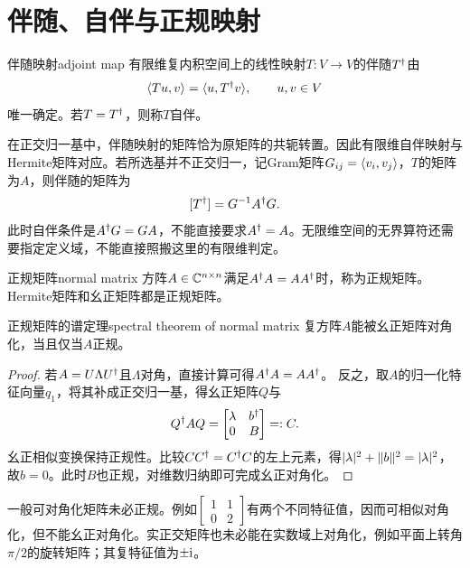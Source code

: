 \section{伴随、自伴与正规映射}
\begin{definition}{伴随映射}{adjoint map}
    有限维复内积空间上的线性映射$T:V \to V$的伴随$T^\dagger$由
    \begin{equation}\label{eq:la-adjoint-definition}
        \langle Tu,v\rangle = \langle u,T^\dagger v\rangle,\qquad u,v \in V
    \end{equation}
    唯一确定。若$T = T^\dagger$，则称$T$自伴。
\end{definition}
在正交归一基中，伴随映射的矩阵恰为原矩阵的共轭转置。因此有限维自伴映射与Hermite矩阵对应。若所选基并不正交归一，记Gram矩阵$G_{ij} = \langle v_i,v_j\rangle$，$T$的矩阵为$A$，则伴随的矩阵为
\begin{equation}\label{eq:la-adjoint-gram-matrix}
    [T^\dagger] = G^{-1} A^\dagger G.
\end{equation}
此时自伴条件是$A^\dagger G = GA$，不能直接要求$A^\dagger = A$。无限维空间的无界算符还需要指定定义域，不能直接照搬这里的有限维判定。

\begin{definition}{正规矩阵}{normal matrix}
    方阵$A \in \mathbb{C}^{n\times n}$满足$A^\dagger A = AA^\dagger$时，称为正规矩阵。Hermite矩阵和幺正矩阵都是正规矩阵。
\end{definition}
\begin{theorem}{正规矩阵的谱定理}{spectral theorem of normal matrix}
    复方阵$A$能被幺正矩阵对角化，当且仅当$A$正规。
\end{theorem}
\begin{proof}
    若$A = U\Lambda U^\dagger$且$\Lambda$对角，直接计算可得$A^\dagger A = AA^\dagger$。
    反之，取$A$的归一化特征向量$q_1$，将其补成正交归一基，得幺正矩阵$Q$与
    \[
        Q^\dagger AQ = \begin{bmatrix}\lambda&b^\dagger\\0&B\end{bmatrix} =: C.
    \]
    幺正相似变换保持正规性。比较$CC^\dagger = C^\dagger C$的左上元素，得$\lvert\lambda\rvert^2 + \lVert b\rVert^2 = \lvert\lambda\rvert^2$，故$b = 0$。此时$B$也正规，对维数归纳即可完成幺正对角化。
\end{proof}
\begin{remark}
    一般可对角化矩阵未必正规。例如$\begin{bmatrix}1&1\\0&2\end{bmatrix}$有两个不同特征值，因而可相似对角化，但不能幺正对角化。实正交矩阵也未必能在实数域上对角化，例如平面上转角$\pi/2$的旋转矩阵；其复特征值为$\pm\mathrm{i}$。
\end{remark}
